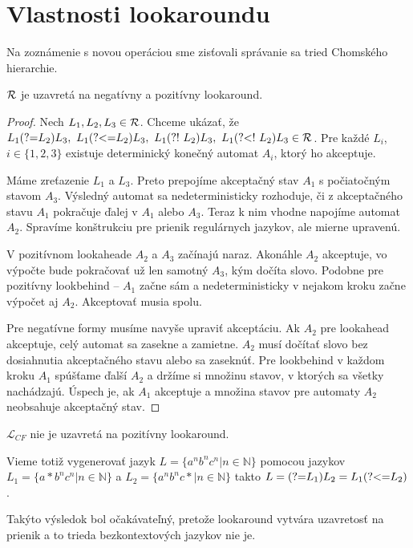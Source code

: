 \documentclass{svk_long_sk}
\def\R{{\cal R}} %
\def\L{\mathscr{L}} %
\def\N{\mathds{N}} %
\def\lookahead{\text{(?=}}
\def\nlookahead{\text{(?!~}}
\def\lookbehind{\text{(?\textless =}}
\def\nlookbehind{\text{(?\textless !~}}
\begin{document}
\section{Vlastnosti lookaroundu}
Na zoznámenie s novou operáciou sme zisťovali správanie sa tried Chomského hierarchie.
\begin{theorem}\label{R_uz_lalb}
$\R$ je uzavretá na negatívny a pozitívny look\-around.
\end{theorem}
\begin{proof}
Nech $L_1,L_2,L_3\in\R$. Chceme ukázať, že $L_1\lookahead L_2)L_3,~ L_1\lookbehind L_2)L_3,~ L_1\nlookahead L_2)L_3,~ L_1\nlookbehind L_2)L_3\allowbreak \in \R$. Pre každé $L_i$, $i \in \lbrace 1,2,3\rbrace$ existuje determinický konečný automat $A_i$, ktorý ho akceptuje.

Máme zreťazenie $L_1$ a $L_3$. Preto prepojíme akceptačný stav $A_1$ s počiatočným stavom $A_3$. Výsledný automat sa nedeterministicky rozhoduje, či z akceptačného stavu $A_1$ pokračuje ďalej v $A_1$ alebo $A_3$. Teraz k nim vhodne napojíme automat $A_2$. Spravíme konštrukciu pre prienik regulárnych jazykov, ale mierne upravenú.

V pozitívnom lookaheade $A_2$ a $A_3$ začínajú naraz. Akonáhle $A_2$ akceptuje, vo výpočte bude pokračovať už len samotný $A_3$, kým dočíta slovo. Podobne pre pozitívny lookbehind -- $A_1$ začne sám a nedeterministicky v nejakom kroku začne výpočet aj $A_2$. Akceptovať musia spolu.

Pre negatívne formy musíme navyše upraviť akceptáciu. Ak $A_2$ pre lookahead akceptuje, celý automat sa zasekne a zamietne. $A_2$ musí dočítať slovo bez dosiahnutia akceptačného stavu alebo sa zaseknúť. Pre lookbehind v každom kroku $A_1$ spúšťame ďalší $A_2$ a držíme si množinu stavov, v ktorých sa všetky nachádzajú. Úspech je, ak $A_1$ akceptuje a množina stavov pre automaty $A_2$ neobsahuje akceptačný stav.

\end{proof}

\begin{theorem}
$\L_{CF}$ nie je uzavretá na pozitívny lookaround.
\end{theorem}
Vieme totiž vygenerovať jazyk $L=\lbrace a^nb^nc^n|n\in\N\rbrace$ pomocou jazykov $L_1=\lbrace a*b^nc^n|n\in\N\rbrace$ a $L_2=\lbrace a^nb^nc*|n\in\N\rbrace$ takto $L=\lookahead L_1)L_2 =L_1\lookbehind L_2)$.

Takýto výsledok bol očakávateľný, pretože lookaround vytvára uzavretosť na prienik a to trieda bezkontextových jazykov nie je.
\end{document}
